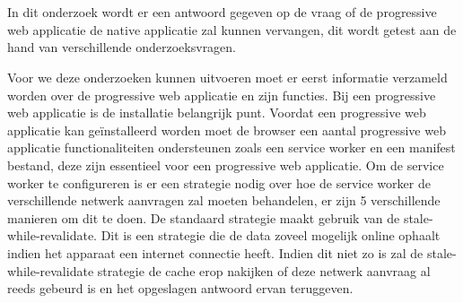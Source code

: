 
%
%

%



\chapter*{}
In dit onderzoek wordt er een antwoord gegeven op de vraag of de progressive web applicatie de native applicatie zal kunnen vervangen, dit wordt getest aan de hand van verschillende onderzoeksvragen.

Voor we deze onderzoeken kunnen uitvoeren moet er eerst informatie verzameld worden over de progressive web applicatie en zijn functies. Bij een progressive web applicatie is de installatie belangrijk punt. Voordat een progressive web applicatie kan geïnstalleerd worden moet de browser een aantal progressive web applicatie functionaliteiten ondersteunen zoals een service worker en een manifest bestand, deze zijn essentieel voor een progressive web applicatie. Om de service worker te configureren is er een strategie nodig over hoe de service worker de verschillende netwerk aanvragen zal moeten behandelen, er zijn 5 verschillende manieren om dit te doen. De standaard strategie maakt gebruik van de stale-while-revalidate. Dit is een strategie die de data zoveel mogelijk online ophaalt indien het apparaat een internet connectie heeft. Indien dit niet zo is zal de stale-while-revalidate strategie de cache erop nakijken of deze netwerk aanvraag al reeds gebeurd is en het opgeslagen antwoord ervan teruggeven.

